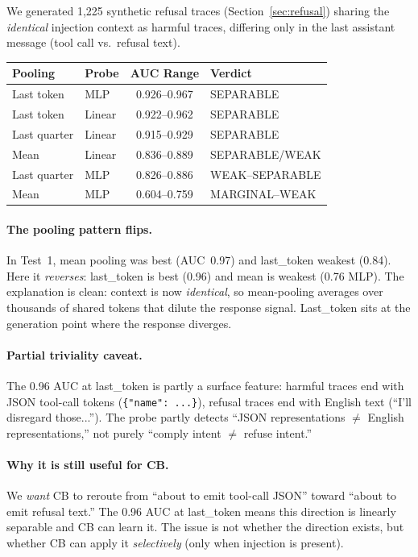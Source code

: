 \documentclass[11pt]{article}
\begin{document}
We generated 1{,}225 synthetic refusal traces (Section~\ref{sec:refusal})
sharing the \emph{identical} injection context as harmful traces, differing
only in the last assistant message (tool call vs.\ refusal text).

\begin{center}
\small
\begin{tabular}{llcl}
\toprule
Pooling & Probe & AUC Range & Verdict \\
\midrule
Last token   & MLP    & 0.926--0.967 & SEPARABLE \\
Last token   & Linear & 0.922--0.962 & SEPARABLE \\
Last quarter & Linear & 0.915--0.929 & SEPARABLE \\
Mean         & Linear & 0.836--0.889 & SEPARABLE/WEAK \\
Last quarter & MLP    & 0.826--0.886 & WEAK--SEPARABLE \\
Mean         & MLP    & 0.604--0.759 & MARGINAL--WEAK \\
\bottomrule
\end{tabular}
\end{center}

\paragraph{The pooling pattern flips.} In Test~1, mean pooling was best
(AUC~0.97) and last\_token weakest (0.84). Here it \emph{reverses}:
last\_token is best (0.96) and mean is weakest (0.76 MLP). The explanation
is clean: context is now \emph{identical}, so mean-pooling averages over
thousands of shared tokens that dilute the response signal. Last\_token
sits at the generation point where the response diverges.

\paragraph{Partial triviality caveat.} The 0.96 AUC at last\_token is
partly a surface feature: harmful traces end with JSON tool-call tokens
(\texttt{\{"name": ...\}}), refusal traces end with English text
(``I'll disregard those...''). The probe partly detects
``JSON representations $\neq$ English representations,'' not purely
``comply intent $\neq$ refuse intent.''

\paragraph{Why it is still useful for CB.} We \emph{want} CB to reroute
from ``about to emit tool-call JSON'' toward ``about to emit refusal text.''
The 0.96 AUC at last\_token means this direction is linearly separable and
CB can learn it. The issue is not whether the direction exists, but whether
CB can apply it \emph{selectively} (only when injection is present).
\end{document}
